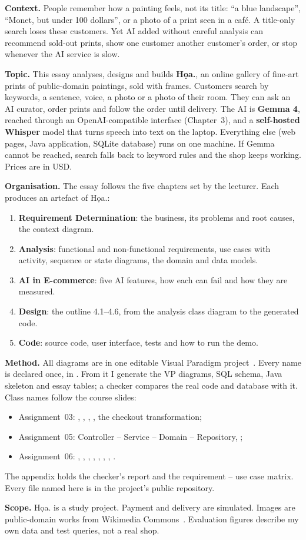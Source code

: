 \textbf{Context.} People remember how a painting feels, not its title: ``a blue landscape'', ``Monet, but under 100
dollars'', or a photo of a print seen in a caf\'e. A title-only search loses these customers. Yet AI added without
careful analysis can recommend sold-out prints, show one customer another customer's order, or stop whenever the AI
service is slow.

\textbf{Topic.} This essay analyses, designs and builds \textbf{Họa.}, an online gallery of fine-art prints of
public-domain paintings, sold with frames. Customers search by keywords, a sentence, voice, a photo or a photo of
their room. They can ask an AI curator, order prints and follow the order until delivery. The AI is
\textbf{Gemma 4}, reached through an OpenAI-compatible interface (Chapter~3), and a \textbf{self-hosted Whisper}
model that turns speech into text on the laptop. Everything else (web pages, Java application, SQLite database)
runs on one machine. If Gemma cannot be reached, search falls back to keyword rules and the shop keeps working.
Prices are in USD.

\textbf{Organisation.} The essay follows the five chapters set by the lecturer. Each produces an artefact of Họa.:
\begin{enumerate}
\item \textbf{Requirement Determination}: the business, its problems and root causes, the context diagram.
\item \textbf{Analysis}: \nFR{} functional and \nNFR{} non-functional requirements, \nUseCases{} use cases with
      activity, sequence or state diagrams, the domain and data models.
\item \textbf{AI in E-commerce}: five AI features, how each can fail and how they are measured.
\item \textbf{Design}: the outline 4.1--4.6, from the analysis class diagram to the generated code.
\item \textbf{Code}: source code, user interface, tests and how to run the demo.
\end{enumerate}

\textbf{Method.} All diagrams are in one editable Visual Paradigm project~\cite{visualparadigm}. Every name is
declared once, in . From it I generate the VP diagrams, SQL schema, Java skeleton and essay
tables; a checker compares the real code and database with it. Class names follow the course slides:
{\raggedright
\begin{itemize}
\item Assignment~03: , , , , the checkout transformation;
\item Assignment~05: Controller -- Service -- Domain -- Repository, ;
\item Assignment~06: , , , ,
      , , , .
\end{itemize}
\par}
The appendix holds the checker's report and the requirement -- use case matrix. Every file named here is in the
project's public repository.

\textbf{Scope.} Họa. is a study project. Payment and delivery are simulated. Images are public-domain works from
Wikimedia Commons~\cite{wikimedia}. Evaluation figures describe my own data and test queries, not a real shop.
